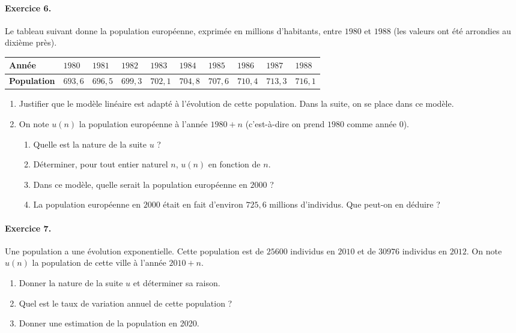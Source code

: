 \documentclass[11pt]{article}
\begin{document}
\paragraph{Exercice 6.}
Le tableau suivant donne la population européenne, exprimée en millions d’habitants, entre $1980$ et $1988$ (les valeurs ont été arrondies au dixième près).
\begin{center}
	\begin{tabular}{|>{\centering\arraybackslash}m{2cm}|>{\centering\arraybackslash}m{1.1cm}|>{\centering\arraybackslash}m{1.1cm}|>{\centering\arraybackslash}m{1.1cm}|>{\centering\arraybackslash}m{1.1cm}|>{\centering\arraybackslash}m{1.1cm}|>{\centering\arraybackslash}m{1.1cm}|>{\centering\arraybackslash}m{1.1cm}|>{\centering\arraybackslash}m{1.1cm}|>{\centering\arraybackslash}m{1.1cm}|}
		\hline
		\textbf{Année} & $1980$ & $1981$ & $1982$ & $1983$ & $1984$ & $1985$ & $1986$ & $1987$ & $1988$  \\
		\hline
		\textbf{Population} & $693,6$ & $696,5$ & $699,3$ & $702,1$ & $704,8$ & $707,6$ & $710,4$ & $713,3$ & $716,1$ \\
		\hline
	\end{tabular}
\end{center}
\begin{enumerate}
	\item Justifier que le modèle linéaire est adapté à l’évolution de cette population. Dans la suite, on se place dans ce modèle.
	\item On note $u(n)$ la population européenne à l’année $1980 + n$ (c’est-à-dire on prend $1980$ comme année $0$).
	\begin{enumerate}
		\item Quelle est la nature de la suite $u$ ?
		\item Déterminer, pour tout entier naturel $n$, $u(n)$ en fonction de $n$.
		\item Dans ce modèle, quelle serait la population européenne en $2000$ ?
		\item La population européenne en $2000$ était en fait d’environ $725,6$ millions d’individus.
		Que peut-on en déduire ?
	\end{enumerate}
\end{enumerate}

\paragraph{Exercice 7.}
Une population a une évolution exponentielle. Cette population est de ${25 600}$
individus en $2010$ et de ${30 976}$ individus en $2012$. On note $u(n)$ la
population de cette ville à l’année $2010 + n$.
\begin{enumerate}
	\item Donner la nature de la suite $u$ et déterminer sa raison.
	\item Quel est le taux de variation annuel de cette population ?
	\item Donner une estimation de la population en 2020.
\end{enumerate}
\end{document}
